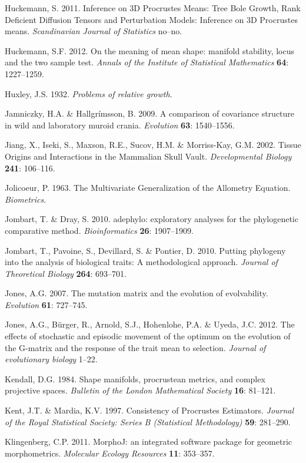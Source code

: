 \documentclass[12pt,twoside]{report}
\begin{document}
Huckemann, S. 2011. Inference on 3D Procrustes Means: Tree Bole Growth,
Rank Deficient Diffusion Tensors and Perturbation Models: Inference on
3D Procrustes means. \emph{Scandinavian Journal of Statistics} no--no.

Huckemann, S.F. 2012. On the meaning of mean shape: manifold stability,
locus and the two sample test. \emph{Annals of the Institute of
Statistical Mathematics} \textbf{64}: 1227--1259.

Huxley, J.S. 1932. \emph{Problems of relative growth}.

Jamniczky, H.A. \& Hallgrímsson, B. 2009. A comparison of covariance
structure in wild and laboratory muroid crania. \emph{Evolution}
\textbf{63}: 1540--1556.

Jiang, X., Iseki, S., Maxson, R.E., Sucov, H.M. \& Morriss-Kay, G.M.
2002. Tissue Origins and Interactions in the Mammalian Skull Vault.
\emph{Developmental Biology} \textbf{241}: 106--116.

Jolicoeur, P. 1963. The Multivariate Generalization of the Allometry
Equation. \emph{Biometrics}.

Jombart, T. \& Dray, S. 2010. adephylo: exploratory analyses for the
phylogenetic comparative method. \emph{Bioinformatics} \textbf{26}:
1907--1909.

Jombart, T., Pavoine, S., Devillard, S. \& Pontier, D. 2010. Putting
phylogeny into the analysis of biological traits: A methodological
approach. \emph{Journal of Theoretical Biology} \textbf{264}: 693--701.

Jones, A.G. 2007. The mutation matrix and the evolution of evolvability.
\emph{Evolution} \textbf{61}: 727--745.

Jones, A.G., Bürger, R., Arnold, S.J., Hohenlohe, P.A. \& Uyeda, J.C.
2012. The effects of stochastic and episodic movement of the optimum on
the evolution of the G-matrix and the response of the trait mean to
selection. \emph{Journal of evolutionary biology} 1--22.

Kendall, D.G. 1984. Shape manifolds, procrustean metrics, and complex
projective spaces. \emph{Bulletin of the London Mathematical Society}
\textbf{16}: 81--121.

Kent, J.T. \& Mardia, K.V. 1997. Consistency of Procrustes Estimators.
\emph{Journal of the Royal Statistical Society: Series B (Statistical
Methodology)} \textbf{59}: 281--290.

Klingenberg, C.P. 2011. MorphoJ: an integrated software package for
geometric morphometrics. \emph{Molecular Ecology Resources} \textbf{11}:
353--357.
\end{document}
